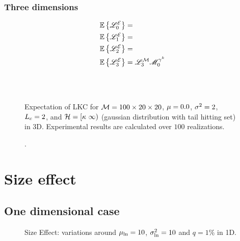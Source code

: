 \documentclass[a4paper,12pt]{article}
\begin{document}
\newpage
\subsubsection{Three dimensions}
\begin{subequations}
\begin{align}
  &\Expec\left\{\LKC_0^\ES\right\} = \\%
  &\Expec\left\{\LKC_1^\ES\right\} = \\%
  &\Expec\left\{\LKC_2^\ES\right\} = \\%
  &\Expec\left\{\LKC_3^\ES\right\} = \LKC_3^\MRF\GMFk_0
\end{align}
\end{subequations}

\begin{figure}[!h]
  \centering
  \subfigure{\scalebox{0.35}{}}\hspace{1.2cm}
  \subfigure{\scalebox{0.35}{}}\\
  \subfigure{\scalebox{0.35}{}}\hspace{1.2cm}
  \subfigure{\scalebox{0.35}{}}\\
  \caption{Expectation of LKC for $\mathcal{M}=100\times 20 \times 20$, $\mu=0.0$, $\sigma^2=2$, $L_c=2$, and $\mathcal{H}=[\kappa\ \infty)$ (gaussian distribution with tail hitting set) in 3D. Experimental results are calculated over $100$ realizations.}
\end{figure}

\begin{figure}[!h]
  \centering
  \subfigure{\scalebox{0.35}{}}\hspace{1.2cm}
  \subfigure{\scalebox{0.35}{}}
  \caption{.}
\end{figure}

\newpage
\section{Size effect}
\subsection{One dimensional case}
\begin{figure}[!h]
  \centering
  \hfill
   \hfill
  \caption{Size Effect: variations around $\mu_{\ln}=10$, $\sigma_{\ln}^2=10$ and $q=1\%$ in 1D.}
\end{figure}
\end{document}
